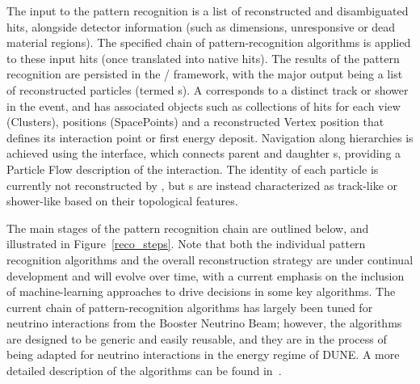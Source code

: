 

The input to the  pattern recognition is a list of reconstructed and disambiguated \twod hits, alongside detector information (such as dimensions, unresponsive or dead material regions). The specified chain of pattern-recognition algorithms is applied to these input hits (once translated into native  \twod hits). The results of the pattern recognition are persisted in the / framework, with the major output being a list of reconstructed \threed particles (termed s). A  corresponds to a distinct track or shower in the event, and has associated objects such as collections of \twod hits for each view (Clusters), \threed positions (SpacePoints) and a reconstructed Vertex position that defines its interaction point or first energy deposit. Navigation along  hierarchies is achieved using the  interface, which connects parent and daughter s, providing a Particle Flow description of the interaction. The identity of each particle is currently not reconstructed by , but s are instead characterized as track-like or shower-like based on their topological features. 

The main stages of the  pattern recognition chain are outlined below, and illustrated in Figure~\ref{reco_steps}. Note that both the individual pattern recognition algorithms and the overall reconstruction strategy are under continual development and will evolve over time, with a current emphasis %
on the inclusion of machine-learning approaches to drive decisions in some key algorithms. The current chain of pattern-recognition algorithms has largely been tuned for neutrino interactions from the \fnal Booster Neutrino Beam; however, the algorithms are designed to be generic and easily reusable, and they are in the process of being adapted for neutrino interactions in the energy regime of DUNE. A more detailed description of the algorithms can be found in~\cite{Acciarri:2017hat}. 


